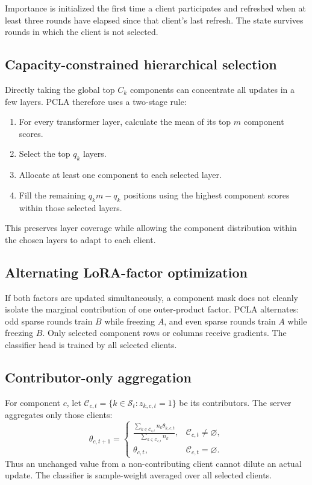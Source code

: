 \documentclass[11pt,a4paper]{article}
\begin{document}
Importance is initialized the first time a client participates and refreshed
when at least three rounds have elapsed since that client's last refresh. The
state survives rounds in which the client is not selected.

\subsection{Capacity-constrained hierarchical selection}

Directly taking the global top $C_k$ components can concentrate all updates in
a few layers. PCLA therefore uses a two-stage rule:
\begin{enumerate}[leftmargin=1.6em]
  \item For every transformer layer, calculate the mean of its top $m$
  component scores.
  \item Select the top $q_k$ layers.
  \item Allocate at least one component to each selected layer.
  \item Fill the remaining $q_km-q_k$ positions using the highest component
  scores within those selected layers.
\end{enumerate}
This preserves layer coverage while allowing the component distribution within
the chosen layers to adapt to each client.

\subsection{Alternating LoRA-factor optimization}

If both factors are updated simultaneously, a component mask does not cleanly
isolate the marginal contribution of one outer-product factor. PCLA alternates:
odd sparse rounds train $B$ while freezing $A$, and even sparse rounds train
$A$ while freezing $B$. Only selected component rows or columns receive
gradients. The classifier head is trained by all selected clients.

\subsection{Contributor-only aggregation}

For component $c$, let
$\mathcal{C}_{c,t}=\{k\in\mathcal{S}_t:z_{k,c,t}=1\}$ be its contributors.
The server aggregates only those clients:
\begin{equation}
  \theta_{c,t+1} =
  \begin{cases}
  \displaystyle
  \frac{\sum_{k\in\mathcal{C}_{c,t}}n_k\theta_{k,c,t}}
       {\sum_{k\in\mathcal{C}_{c,t}}n_k},
       & \mathcal{C}_{c,t}\ne\varnothing,\\[1.2em]
  \theta_{c,t}, & \mathcal{C}_{c,t}=\varnothing.
  \end{cases}
  \label{eq:aggregation}
\end{equation}
Thus an unchanged value from a non-contributing client cannot dilute an actual
update. The classifier is sample-weight averaged over all selected clients.
\end{document}
